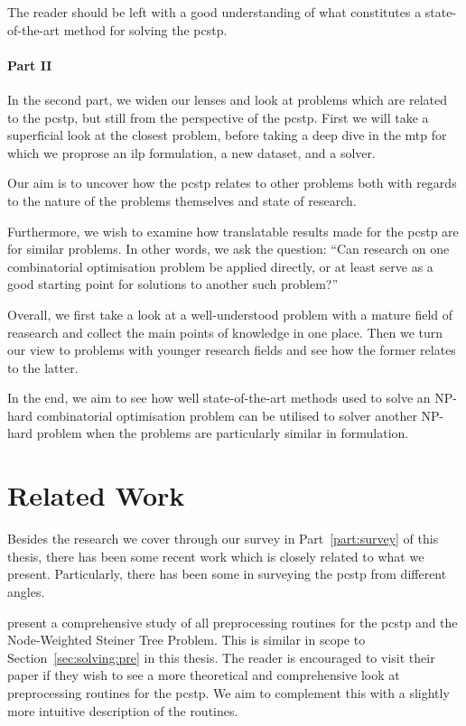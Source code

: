 The reader should be left with a good understanding of
what constitutes a state-of-the-art method for solving the \gls{pcstp}.

\paragraph{Part II}

In the second part, we widen our lenses and look at problems which are related to the \gls{pcstp},
but still from the perspective of
the \gls{pcstp}.
First we will take a superficial look at the closest problem,
before taking a deep dive in the \acrlong{mtp} for which
we proprose an \gls{ilp} formulation, a new dataset, and a solver.

Our aim is to uncover how the \gls{pcstp} relates to other problems
both with regards to the nature of the problems themselves and state of
research.

Furthermore, we wish to examine how translatable results made for the \gls{pcstp} are for similar problems.
In other words, we ask the question:
``Can research on one combinatorial optimisation problem be applied directly, or at least
serve as a good starting point for solutions to another such problem?''

\medskip\noindent
Overall, we first take a look at a well-understood problem with a mature field of reasearch and collect
the main points of knowledge in one place. Then we turn our view to problems with younger research fields
and see how the former relates to the latter.

In the end, we aim to see how well state-of-the-art methods used to solve an NP-hard combinatorial
optimisation problem can be utilised to solver another NP-hard problem when the problems are particularly
similar in formulation.

\section{Related Work}
Besides the research we cover through our survey in
Part~\ref{part:survey} of this thesis,
there has been some recent work which is closely related
 to what we present. Particularly, there has been some in surveying the
\acrlong{pcstp} from different angles.

\citet*{rehfeldt2016reduction} present a comprehensive study of all preprocessing routines
for the \gls{pcstp} and the Node-Weighted Steiner Tree Problem. This is similar in scope to
Section~\ref{sec:solving:pre} in this thesis. The reader is encouraged to visit their paper
if they wish to see a more theoretical and comprehensive look at preprocessing routines for
the \gls{pcstp}. We aim to complement this with a slightly more intuitive description of the
routines.

